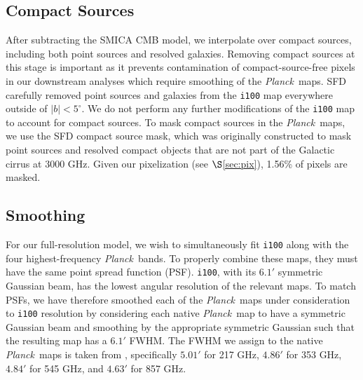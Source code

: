 \documentclass{emulateapj}
\newcommand{\PLANCK}{{\it Planck}}
\begin{document}
\subsection{Compact Sources}
\label{sec:ptsrc}
After subtracting the SMICA CMB model, we interpolate over compact sources, 
including both point sources and resolved galaxies. Removing compact sources at
this stage is important as it prevents contamination of compact-source-free 
pixels in our downstream analyses which require smoothing of the \PLANCK~maps. 
SFD carefully removed point sources and galaxies from the \verb|i100| map 
everywhere outside of $|b|$$<$$5^{\circ}$. We do not perform any further 
modifications of the \verb|i100| map to account for compact sources. To mask 
compact sources in the \PLANCK~maps, we use the SFD compact source mask, which 
was originally constructed to mask point sources and resolved compact objects 
that are not part of the Galactic cirrus at 3000 GHz. Given our pixelization 
(see $\S$\ref{sec:pix}), 1.56\% of pixels are masked. 



\subsection{Smoothing}
\label{sec:smth}
For our full-resolution model, we wish to simultaneously fit \verb|i100| along 
with the four highest-frequency \PLANCK~bands. To properly combine these maps, 
they must have the same point spread function (PSF). \verb|i100|, with its 
$6.1'$ symmetric Gaussian beam, has the lowest angular resolution of the 
relevant maps. To match PSFs, we have therefore smoothed each of the 
\PLANCK~maps under consideration to \verb|i100| resolution by considering each 
native \PLANCK~map to have a symmetric Gaussian beam and smoothing by the 
appropriate symmetric Gaussian such that the resulting map has a  $6.1'$ FWHM. 
The FWHM we assign to the native \PLANCK~maps is taken from \cite{planckbeam}, 
specifically $5.01'$ for 217 GHz, $4.86'$ for 353 GHz, $4.84'$ for 545 GHz, and
 $4.63'$ for 857 GHz.
\end{document}
